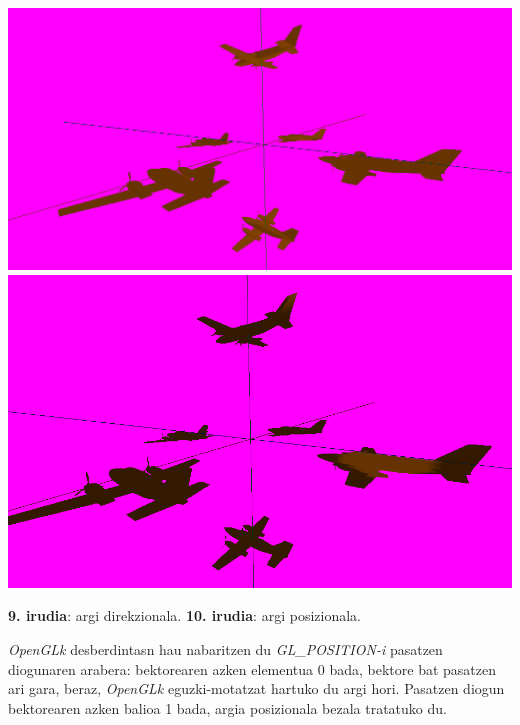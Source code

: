 \documentclass[12pt]{article}
\newcommand{\aldagai}[1] {\textit{#1}}
\begin{document}
\begin{center}
\includegraphics[scale=0.8]{argi_direkzionala.png}
\includegraphics[scale=0.9]{argi_posizionala.png}

\textbf{9. irudia}: argi direkzionala. \textbf{10. irudia}: argi posizionala.
\end{center}

\aldagai{OpenGLk} desberdintasn hau nabaritzen du \aldagai{GL\_POSITION-i} pasatzen diogunaren arabera: bektorearen azken elementua 0 bada, bektore bat pasatzen ari gara, beraz, \aldagai{OpenGLk} eguzki-motatzat hartuko du argi hori. Pasatzen diogun bektorearen azken balioa 1 bada, argia posizionala bezala tratatuko du.\\
\end{document}
